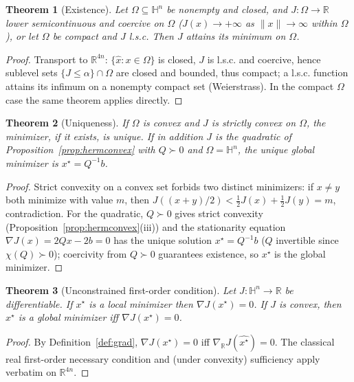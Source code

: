 \documentclass{amsart}
\newtheorem{theorem}{Theorem}
\theoremstyle{definition}
\newcommand{\HH}{\mathbb{H}}
\newcommand{\RR}{\mathbb{R}}
\begin{document}
\begin{theorem}[Existence]
\label{thm:existence}
Let $\Omega\subseteq\HH^n$ be nonempty and closed, and
$J\colon\Omega\to\RR$ lower semicontinuous and coercive on $\Omega$
\textup{(}$J(x)\to+\infty$ as $\|x\|\to\infty$ within $\Omega$\textup{)},
or let $\Omega$ be compact and $J$ l.s.c. Then $J$ attains its minimum
on $\Omega$.
\end{theorem}

\begin{proof}
Transport to $\RR^{4n}$: $\{\widehat x:x\in\Omega\}$ is closed,
$J$ is l.s.c. and coercive, hence sublevel sets
$\{J\le\alpha\}\cap\Omega$ are closed and bounded, thus compact; a
l.s.c. function attains its infimum on a nonempty compact set
(Weierstrass). In the compact $\Omega$ case the same theorem applies
directly.
\end{proof}

\begin{theorem}[Uniqueness]
\label{thm:uniqueness}
If $\Omega$ is convex and $J$ is strictly convex on $\Omega$, the
minimizer, if it exists, is unique. If in addition $J$ is the quadratic
of Proposition~\ref{prop:hermconvex} with $Q\succ0$ and
$\Omega=\HH^n$, the unique global minimizer is $x^\star=Q^{-1}b$.
\end{theorem}

\begin{proof}
Strict convexity on a convex set forbids two distinct minimizers: if
$x\ne y$ both minimize with value $m$, then
$J((x+y)/2)<\tfrac12J(x)+\tfrac12J(y)=m$, contradiction. For the
quadratic, $Q\succ0$ gives strict convexity
(Proposition~\ref{prop:hermconvex}(iii)) and the stationarity equation
$\nabla J(x)=2Qx-2b=0$ has the unique solution $x^\star=Q^{-1}b$
($Q$ invertible since $\chi(Q)\succ0$); coercivity from $Q\succ0$
guarantees existence, so $x^\star$ is the global minimizer.
\end{proof}

\begin{theorem}[Unconstrained first-order condition]
\label{thm:firstorder}
Let $J\colon\HH^n\to\RR$ be differentiable. If $x^\star$ is a local
minimizer then $\nabla J(x^\star)=0$. If $J$ is convex, then $x^\star$
is a global minimizer iff $\nabla J(x^\star)=0$.
\end{theorem}

\begin{proof}
By Definition~\ref{def:grad}, $\nabla J(x^\star)=0$ iff
$\nabla_\RR J(\widehat{x^\star})=0$. The classical real first-order
necessary condition and (under convexity) sufficiency apply verbatim on
$\RR^{4n}$.
\end{proof}
\end{document}
